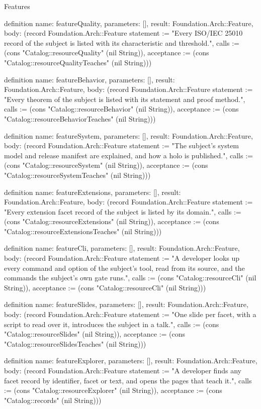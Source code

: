 \begin{lexlean}{Features}
\begin{semanticmodule}
definition{
  name: featureQuality,
  parameters: [],
  result: Foundation.Arch::Feature,
  body: (record Foundation.Arch::Feature {statement := "Every ISO/IEC 25010 record of the subject is listed with its characteristic and threshold.", calls := (cons "Catalog::resourceQuality" (nil String)), acceptance := (cons "Catalog::resourceQualityTeaches" (nil String))})
}

definition{
  name: featureBehavior,
  parameters: [],
  result: Foundation.Arch::Feature,
  body: (record Foundation.Arch::Feature {statement := "Every theorem of the subject is listed with its statement and proof method.", calls := (cons "Catalog::resourceBehavior" (nil String)), acceptance := (cons "Catalog::resourceBehaviorTeaches" (nil String))})
}

definition{
  name: featureSystem,
  parameters: [],
  result: Foundation.Arch::Feature,
  body: (record Foundation.Arch::Feature {statement := "The subject's system model and release manifest are explained, and how a holo is published.", calls := (cons "Catalog::resourceSystem" (nil String)), acceptance := (cons "Catalog::resourceSystemTeaches" (nil String))})
}

definition{
  name: featureExtensions,
  parameters: [],
  result: Foundation.Arch::Feature,
  body: (record Foundation.Arch::Feature {statement := "Every extension facet record of the subject is listed by its domain.", calls := (cons "Catalog::resourceExtensions" (nil String)), acceptance := (cons "Catalog::resourceExtensionsTeaches" (nil String))})
}

definition{
  name: featureCli,
  parameters: [],
  result: Foundation.Arch::Feature,
  body: (record Foundation.Arch::Feature {statement := "A developer looks up every command and option of the subject's tool, read from its source, and the commands the subject's own gate runs.", calls := (cons "Catalog::resourceCli" (nil String)), acceptance := (cons "Catalog::resourceCli" (nil String))})
}

definition{
  name: featureSlides,
  parameters: [],
  result: Foundation.Arch::Feature,
  body: (record Foundation.Arch::Feature {statement := "One slide per facet, with a script to read over it, introduces the subject in a talk.", calls := (cons "Catalog::resourceSlides" (nil String)), acceptance := (cons "Catalog::resourceSlidesTeaches" (nil String))})
}

definition{
  name: featureExplorer,
  parameters: [],
  result: Foundation.Arch::Feature,
  body: (record Foundation.Arch::Feature {statement := "A developer finds any facet record by identifier, facet or text, and opens the pages that teach it.", calls := (cons "Catalog::resourceExplorer" (nil String)), acceptance := (cons "Catalog::records" (nil String))})
}


\end{semanticmodule}
\end{lexlean}
